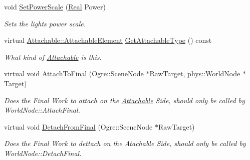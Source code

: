 \begin{DoxyCompactItemize}
void \hyperlink{classphys_1_1Light_af4a6428b87c443a33261575783a4fb05}{SetPowerScale} (\hyperlink{namespacephys_af7eb897198d265b8e868f45240230d5f}{Real} Power)
\begin{DoxyCompactList}\small\item\em Sets the lights power scale. \item\end{DoxyCompactList}\item 
virtual \hyperlink{classphys_1_1Attachable_acd1fca033e7cc0bb3024a92d466d213a}{Attachable::AttachableElement} \hyperlink{classphys_1_1Light_aa592dcf3f22fc0772fb3fc85f7c3a1ae}{GetAttachableType} () const 
\begin{DoxyCompactList}\small\item\em What kind of \hyperlink{classphys_1_1Attachable}{Attachable} is this. \item\end{DoxyCompactList}\item 
virtual void \hyperlink{classphys_1_1Light_ab2c869364b649b9b43fed3d33432c999}{AttachToFinal} (Ogre::SceneNode $\ast$RawTarget, \hyperlink{classphys_1_1WorldNode}{phys::WorldNode} $\ast$Target)
\begin{DoxyCompactList}\small\item\em Does the Final Work to attach on the \hyperlink{classphys_1_1Attachable}{Attachable} Side, should only be called by WorldNode::AttachFinal. \item\end{DoxyCompactList}\item 
virtual void \hyperlink{classphys_1_1Light_a8a12ac91e063a57f21d4ec3a1b76261c}{DetachFromFinal} (Ogre::SceneNode $\ast$RawTarget)
\begin{DoxyCompactList}\small\item\em Does the Final Work to dettach on the Atachable Side, should only be called by WorldNode::DetachFinal. \item\end{DoxyCompactList}\end{DoxyCompactItemize}
